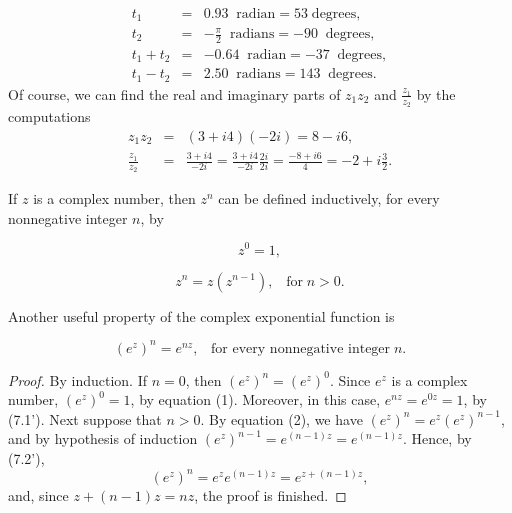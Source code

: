 \begin{example}
\begin{eqnarray*}
           t_{1} &=& 0.93 \;\;\mbox{radian} = 53 \;\mbox{degrees}, \\
           t_{2} &=& - \frac{\pi}{2} \; \;\mbox{radians} = - 90 \; \;\mbox{degrees},\\
t_{1} + t_{2} &=& - 0.64 \;\;\mbox{radian} = - 37 \; \;\mbox{degrees},\\
 t_{1} - t_{2} &=& 2.50 \;\;\mbox{radians} = 143 \; \;\mbox{degrees}.
\end{eqnarray*}
\noindent Of course, we can find the real and imaginary parts of $z_{1}z_{2}$ and $\frac{z_{1}}{z_{2}}$ by the computations
\begin{eqnarray*}
            z_{1}z_{2} &=& (3 + i4)(-2i) = 8 - i6, \\
\frac{z_{1}}{z_{2}} &=& \frac{ 3 + i4}{-2i} = \frac{ 3 + i4}{- 2i} \frac{2i}{2i} 
= \frac{-8 + i6}{4} = -2 + i \frac{3}{2}  .
\end{eqnarray*}
\end{example}

If $z$ is a complex number, then $z^n$ can be defined inductively, for every nonnegative integer $n$, by 

\begin{equation}
z^0 = 1, 
\label{eq6.7.1}
\end{equation}

\begin{equation}
z^n = z(z^{n - 1}),\;\;\;\mbox{for}\; n > 0.  
\label{eq6.7.2}
\end{equation}

\noindent Another useful property of the complex exponential function is

\begin{theorem} %
$$
(e^z)^n = e^{nz},  \;\;\;\mbox{for every nonnegative integer}\; n.
$$
\end{theorem}


\begin{proof}
By induction. If $n = 0$, then $(e^z)^n = (e^z)^0$. Since $e^z$ is a complex number, $(e^z)^0 = 1$, by equation (1). Moreover, in this case, $e^{nz} = e^{0z} = 1$, by (7.1'). Next suppose that $n > 0$. By equation (2), we have $(e^z)^n = e^{z}(e^z)^{n-1}$, and by hypothesis of induction $(e^z)^{n-1} = e^{(n-1)z} = e^{(n - 1)z}$.  Hence, by (7.2'),
$$
(e^z)^n = e^{z}e^{(n-1)z} = e^{z+(n-1)z},
$$
\noindent and, since $z + (n - 1)z = nz$, the proof is finished.
\end{proof}

